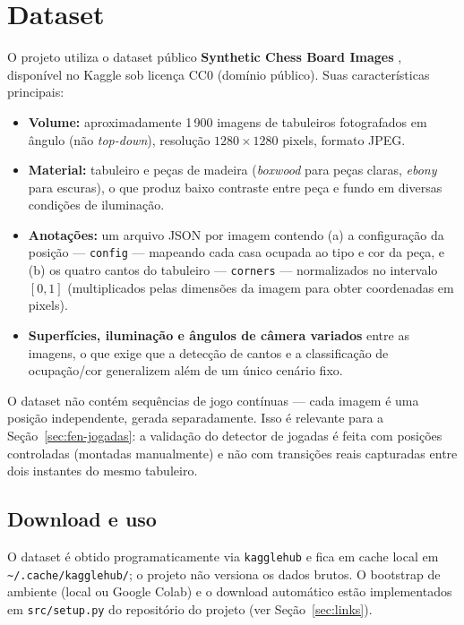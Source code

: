 \section{Dataset}
\label{sec:dataset}

O projeto utiliza o dataset público \textbf{Synthetic Chess Board Images}
\cite{dataset-chess}, disponível no Kaggle sob licença CC0 (domínio público). Suas
características principais:

\begin{itemize}[nosep]
  \item \textbf{Volume:} aproximadamente 1\,900 imagens de tabuleiros fotografados em
        ângulo (não \textit{top-down}), resolução $1280 \times 1280$ pixels, formato
        JPEG.
  \item \textbf{Material:} tabuleiro e peças de madeira (\textit{boxwood} para peças
        claras, \textit{ebony} para escuras), o que produz baixo contraste entre peça e
        fundo em diversas condições de iluminação.
  \item \textbf{Anotações:} um arquivo JSON por imagem contendo (a) a configuração da
        posição --- \texttt{config} --- mapeando cada casa ocupada ao tipo e cor da
        peça, e (b) os quatro cantos do tabuleiro --- \texttt{corners} --- normalizados
        no intervalo $[0,1]$ (multiplicados pelas dimensões da imagem para obter
        coordenadas em pixels).
  \item \textbf{Superfícies, iluminação e ângulos de câmera variados} entre as imagens,
        o que exige que a detecção de cantos e a classificação de ocupação/cor
        generalizem além de um único cenário fixo.
\end{itemize}

O dataset não contém sequências de jogo contínuas --- cada imagem é uma posição
independente, gerada separadamente. Isso é relevante para a Seção~\ref{sec:fen-jogadas}:
a validação do detector de jogadas é feita com posições controladas (montadas
manualmente) e não com transições reais capturadas entre dois instantes do mesmo
tabuleiro.

\subsection{Download e uso}

O dataset é obtido programaticamente via \texttt{kagglehub} e fica em cache local em
\texttt{\textasciitilde/.cache/kagglehub/}; o projeto não versiona os dados brutos. O
bootstrap de ambiente (local ou Google Colab) e o download automático estão
implementados em \texttt{src/setup.py} do repositório do projeto (ver
Seção~\ref{sec:links}).
